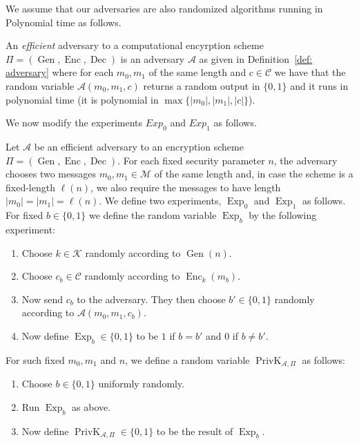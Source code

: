\documentclass[twoside, a4paper, 10pt]{amsart}
\begin{document}
We assume that our adversaries are also randomized algorithms running in Polynomial time as follows.

\begin{mydef} An \textit{efficient} adversary to a computational encyrption scheme  $\Pi = (\operatorname{Gen}, \operatorname{Enc}, \operatorname{Dec})$ is an adversary $\mathcal{A}$ as given in Definition~\ref{def: adversary} where for each $m_0,m_1$ of the same length and $c \in \mathcal{C}$ we have that the random variable $\mathcal{A}(m_0,m_1,c)$ returns a random output in $\{0,1\}$ and it runs in polynomial time (it is polynomial in $\max\{|m_0|, |m_1|, |c|\}$).

\end{mydef}

We now modify the experiments $Exp_0$ and $Exp_1$ as follows.

\begin{mydef} Let $\mathcal{A}$ be an efficient adversary to an encryption scheme $\Pi = (\operatorname{Gen}, \operatorname{Enc}, \operatorname{Dec})$. For each fixed security parameter $n$, the adversary chooses two messages $m_0,m_1 \in \mathcal{M}$ of the same length and, in case the scheme is a fixed-length $\ell(n)$, we also require the messages to have length $|m_0| = |m_1| = \ell(n)$. We define two experiments, $\operatorname{Exp}_0$ and $\operatorname{Exp}_1$ as follows. For fixed $b \in \{0,1\}$ we define the random variable $\operatorname{Exp}_b$ by the following experiment:

\begin{enumerate}
	\item Choose $k \in \mathcal{K}$ randomly according to $\operatorname{Gen}(n)$.
	\item Choose $c_b \in \mathcal{C}$ randomly according to $\operatorname{Enc}_k(m_b)$.
	\item Now send $c_b$ to the adversary. They then choose $b' \in \{0,1\}$ randomly according to $\mathcal{A}(m_0, m_1, c_b)$.
	\item Now define $\operatorname{Exp}_b \in \{0,1\}$ to be $1$ if $b = b'$ and $0$ if $b \neq b'$.
\end{enumerate}

 For such fixed $m_0,m_1$ and $n$, we define a random variable $\operatorname{PrivK}_{\mathcal{A}, \Pi}$ as follows:

\begin{enumerate}
	\item Choose $b \in \{0,1\}$ uniformly randomly.
	\item Run $\operatorname{Exp}_b$ as above.
	\item Now define $\operatorname{PrivK}_{\mathcal{A}, \Pi} \in \{0,1\}$ to be the result of $\operatorname{Exp}_b$.

\end{enumerate}

\end{mydef}
\end{document}
